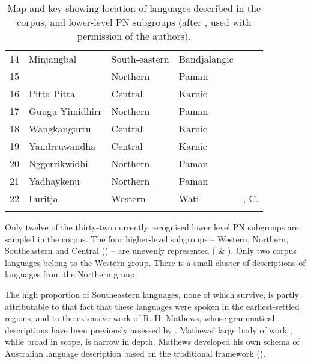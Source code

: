 \begin{table}
{\begin{tabularx}{\textwidth}{lp{2.5cm}llQ}
        14 &	Minjangbal  &	South-eastern	& Bandjalangic & \citealt{livingstone_grammar_1892}\\
        15 &	  &	Northern 	& Paman & \mbox{\citealt{ray_study_1893,ray_linguistics_1907}} \\
        16 &	Pitta Pitta   &	Central	& Karnic & \citealt{roth_ethnological_1897} \\
        17 &	Guugu{\hyp}Yimidhirr  &	Northern 	& Paman & \citealt{schwarz_koko_1900,roth_structure_1901,ray_linguistics_1907}\\
        18 &	Wangkangurru & Central	& Karnic & \citealt{reuther_ms_1901b} \\
        19 &	Yandrruwandha &	Central	& Karnic & \citealt{reuther_ms_1901b} \\
        20 &	Nggerrikwidhi  & Northern & Paman & \citealt{hey_elementary_1903,ray_linguistics_1907}\\
        21 &	Yadhaykenu  &	Northern & Paman & \citealt{ray_linguistics_1907} \\
        22 &	Luritja  &	Western	& Wati & \citealt{mathews_languages_1907}, C. \citealt{strehlow_notitle_1910}\\
        \lspbottomrule
    \end{tabularx}
    }
    \caption{Map and key showing location of languages described in the corpus, and lower-level PN subgroups (after \citealt[820]{bowern_computational_2012}, used with permission of the authors).}
    \label{tab:chap1:map}
\end{table}

Only twelve of the thirty-two currently recognised lower level PN subgroups \citep[820]{bowern_computational_2012} are sampled in the corpus. The four higher-level subgroups – Western, Northern, Southeastern and Central (\citealt[837--838]{bowern_computational_2012}) – are unevenly represented ( \& ). Only two corpus languages belong to the Western group. There is a small cluster of descriptions of languages from the Northern group. 

The high proportion of Southeastern languages, none of which survive, is partly attributable to that fact that these languages were spoken in the earliest-settled regions, and to the extensive work of R. H. Mathews, whose grammatical descriptions have been previously assessed by \citet{koch_r_2008}. Mathews’ large body of work \citep[211--216]{koch_r_2008}, while broad in scope, is narrow in depth. Mathews developed his own schema of Australian language description based on the traditional framework ().

